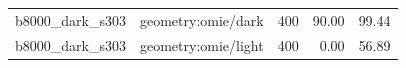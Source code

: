 \begin{longtable}{l>{\raggedright\arraybackslash}p{.42\linewidth}rrr}
b8000\_\allowbreak{}dark\_\allowbreak{}s303 & %
geometry:omie/dark & %
400 & %
90.00 & %
99.44 \\ %

b8000\_\allowbreak{}dark\_\allowbreak{}s303 & %
geometry:omie/light & %
400 & %
0.00 & %
56.89 \\ %


\end{longtable}

